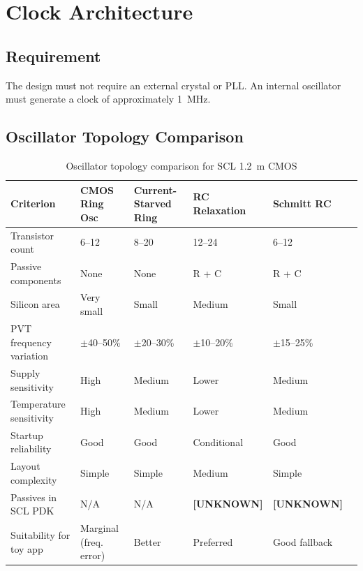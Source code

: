 \documentclass[11pt,a4paper]{article}
\newcommand{\unknown}{\textcolor{unknown}{\textbf{[UNKNOWN]}}}
\begin{document}
\section{Clock Architecture}

\subsection{Requirement}

The design must not require an external crystal or PLL. An internal oscillator must generate a
clock of approximately 1~MHz.

\subsection{Oscillator Topology Comparison}

\begin{table}[H]
  \centering
  \caption{Oscillator topology comparison for SCL 1.2~\textmu m CMOS}
  \scriptsize
  \begin{tabularx}{\textwidth}{p{3cm}XXXXX}
    \toprule
    \textbf{Criterion}        & \textbf{CMOS Ring Osc} & \textbf{Current-Starved Ring} &
                                \textbf{RC Relaxation} & \textbf{Schmitt RC} \\
    \midrule
    Transistor count          & 6--12 & 8--20 & 12--24 & 6--12 \\
    Passive components        & None  & None  & R + C  & R + C \\
    Silicon area              & Very small & Small & Medium & Small \\
    PVT frequency variation   & $\pm$40--50\% & $\pm$20--30\% & $\pm$10--20\% & $\pm$15--25\% \\
    Supply sensitivity        & High  & Medium & Lower  & Medium \\
    Temperature sensitivity   & High  & Medium & Lower  & Medium \\
    Startup reliability       & Good  & Good  & Conditional & Good \\
    Layout complexity         & Simple & Simple & Medium & Simple \\
    Passives in SCL PDK       & N/A   & N/A   & \unknown & \unknown \\
    Suitability for toy app   & Marginal (freq. error) & Better & Preferred & Good fallback \\
    \bottomrule
  \end{tabularx}
\end{table}
\end{document}
